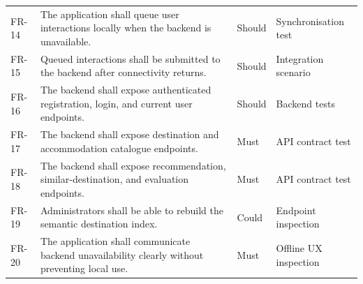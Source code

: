 \begin{longtable}{p{1.4cm}p{8.7cm}p{2.0cm}p{2.2cm}}
FR-14 & The application shall queue user interactions locally when the backend is unavailable. & Should & Synchronisation test \\
FR-15 & Queued interactions shall be submitted to the backend after connectivity returns. & Should & Integration scenario \\
FR-16 & The backend shall expose authenticated registration, login, and current user endpoints. & Should & Backend tests \\
FR-17 & The backend shall expose destination and accommodation catalogue endpoints. & Must & API contract test \\
FR-18 & The backend shall expose recommendation, similar-destination, and evaluation endpoints. & Must & API contract test \\
FR-19 & Administrators shall be able to rebuild the semantic destination index. & Could & Endpoint inspection \\
FR-20 & The application shall communicate backend unavailability clearly without preventing local use. & Must & Offline UX inspection \\
\bottomrule
\end{longtable}


